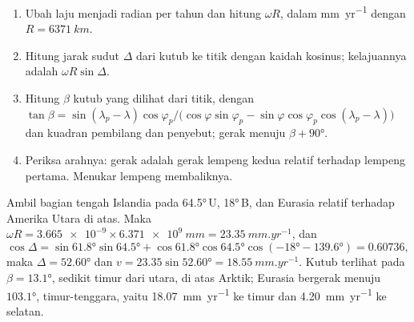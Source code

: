 \begin{method}\label{met:b1:plate-kinematics:velocity}
\begin{enumerate}
  \item Ubah laju  menjadi radian per tahun dan hitung $\omega R$, dalam \unit{mm.yr^{-1}} dengan $R = \qty{6371}{km}$.
  \item Hitung jarak sudut $\Delta$ dari kutub ke titik dengan kaidah kosinus; kelajuannya adalah $\omega R\sin\Delta$.
  \item Hitung  $\beta$ kutub yang dilihat dari titik, dengan
        $\tan\beta = \sin(\lambda_p - \lambda)\cos\varphi_p /
        \bigl(\cos\varphi\sin\varphi_p - \sin\varphi\cos\varphi_p
        \cos(\lambda_p - \lambda)\bigr)$ dan kuadran pembilang dan
        penyebut; gerak menuju $\beta + \ang{90}$.
  \item Periksa arahnya: gerak adalah gerak lempeng kedua relatif terhadap lempeng pertama. Menukar lempeng membaliknya.
\end{enumerate}
\end{method}

\begin{example}\label{ex:b1:plate-kinematics:iceland}
Ambil bagian tengah Islandia pada \ang{64.5}\,U, \ang{18}\,B, dan  Eurasia relatif terhadap Amerika Utara di atas. Maka $\omega R =
\num{3.665e-9}\times\qty{6.371e9}{mm} = \qty{23.35}{mm.yr^{-1}}$, dan
\[
  \cos\Delta = \sin\ang{61.8}\sin\ang{64.5}
  + \cos\ang{61.8}\cos\ang{64.5}\cos(\ang{-18} - \ang{139.6}) = 0.60736,
\]
maka $\Delta = \ang{52.60}$ dan $v = 23.35\sin\ang{52.60} = \qty{18.55}{mm.yr^{-1}}$.
Kutub terlihat pada  $\beta = \ang{13.1}$, sedikit timur dari utara, di atas Arktik; Eurasia bergerak menuju $\ang{103.1}$, timur-tenggara, yaitu
\qty{18.07}{mm.yr^{-1}} ke timur dan \qty{4.20}{mm.yr^{-1}} ke selatan.
\end{example}

